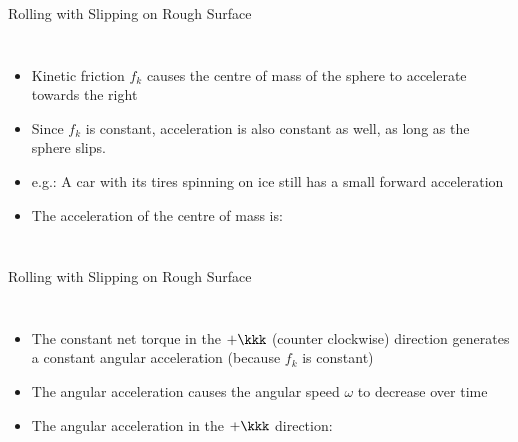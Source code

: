 \documentclass[12pt,compress,aspectratio=169]{beamer}
\begin{document}
\begin{frame}{Rolling with Slipping on Rough Surface}
  \begin{columns}
    

    \begin{itemize}
    \item Kinetic friction $f_k$ causes the centre of mass of the sphere to
      accelerate towards the right


    \item\vspace{-.2in}Since $f_k$ is constant, acceleration is also constant
      as well, as long as the sphere slips.
    \item e.g.: A car with its tires spinning on ice still has a small
      forward acceleration
    \item The acceleration of the centre of mass is:

    \end{itemize}
  \end{columns}
\end{frame}



\begin{frame}{Rolling with Slipping on Rough Surface}
  \begin{columns}
    

    \begin{itemize}
    \item The constant net torque in the $+\kkk$ (counter clockwise) direction
      generates a constant angular acceleration (because $f_k$ is constant)

    \item The angular acceleration causes the angular speed $\omega$ to
      decrease over time
    \item The angular acceleration in the $+\kkk$ direction:

    \end{itemize}
  \end{columns}
\end{frame}
\end{document}
